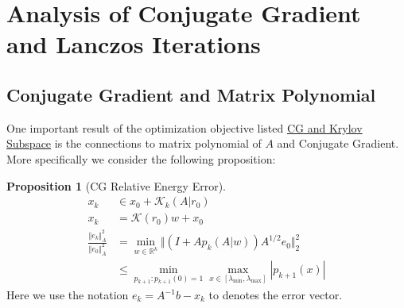 \documentclass[]{article}
\theoremstyle{definition}
\newtheorem{prop}{Proposition}[section]  %
\begin{document}
\section{Analysis of Conjugate Gradient and Lanczos Iterations}
    \subsection{Conjugate Gradient and Matrix Polynomial}
        One important result of the optimization objective listed \hyperref[theorem:CG_and_Krylov_Subspace]{CG and Krylov Subspace} is the connections to matrix polynomial of $A$ and Conjugate Gradient. More specifically we consider the following proposition: 
        \begin{prop}[CG Relative Energy Error]\label{prop:CG_Relative_Energy Error}
            \begin{align}
                x_k &\in x_0 + \mathcal K_k(A|r_0)
                \\
                x_k &= \mathcal{K}(r_0)w + x_0
                \\
                \frac{\Vert e_k\Vert_A^2}{\Vert e_0\Vert_A^2}
                &= 
                \min_{w\in \mathbb R^k} 
                \Vert
                    (I + Ap_k(A|w))A^{1/2}e_0
                \Vert_2^2 
                \\
                &\le
                \min_{p_{k + 1}: p_{k + 1}(0) = 1}\max_{x\in [\lambda_{\text{min}}, \lambda_{\text{max}}]} |p_{k + 1}(x)|
            \end{align}
            Here we use the notation $e_k = A^{-1}b - x_k$ to denotes the error vector. 
        \end{prop}
\end{document}
